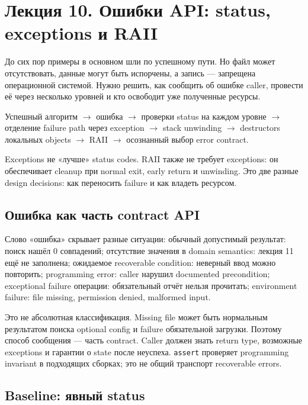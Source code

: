 \section{Лекция 10. Ошибки API: status, exceptions и RAII}
\label{sec:lecture-10}

До сих пор примеры в основном шли по успешному пути. Но файл может отсутствовать,
данные могут быть испорчены, а запись --- запрещена операционной системой. Нужно
решить, как сообщить об ошибке caller, провести её через несколько уровней и кто
освободит уже полученные ресурсы.

\begin{importantbox}
Успешный алгоритм $\rightarrow$ ошибка $\rightarrow$ проверки status на каждом
уровне $\rightarrow$ отделение failure path через exception $\rightarrow$ stack
unwinding $\rightarrow$ destructors локальных objects $\rightarrow$ RAII
$\rightarrow$ осознанный выбор error contract.
\end{importantbox}

Exceptions не «лучше» status codes. RAII также не требует exceptions: он
обеспечивает cleanup при normal exit, early return и unwinding. Это две разные
design decisions: как переносить failure и как владеть ресурсом.

\subsection{Ошибка как часть contract API}

Слово «ошибка» скрывает разные ситуации:
обычный допустимый результат: поиск нашёл 0 совпадений; отсутствие значения в domain semantics: лекция 11 ещё не заполнена; ожидаемое recoverable condition: неверный ввод можно повторить; programming error: caller нарушил documented precondition; exceptional failure операции: обязательный отчёт нельзя прочитать; environment failure: file missing, permission denied, malformed input.

Это не абсолютная классификация. Missing file может быть нормальным результатом
поиска optional config и failure обязательной загрузки. Поэтому способ сообщения
--- часть contract. Caller должен знать return type, возможные exceptions и
гарантии о state после неуспеха. \texttt{assert} проверяет programming invariant
в подходящих сборках; это не общий транспорт recoverable errors.

\subsection{Baseline: явный status}

